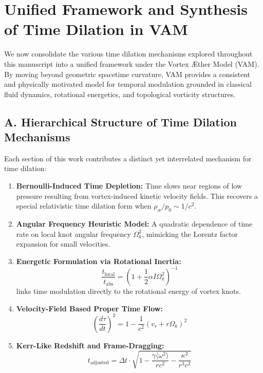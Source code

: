 \section{Unified Framework and Synthesis of Time Dilation in VAM}

We now consolidate the various time dilation mechanisms explored throughout this manuscript into a unified framework under the Vortex Æther Model (VAM). By moving beyond geometric spacetime curvature, VAM provides a consistent and physically motivated model for temporal modulation grounded in classical fluid dynamics, rotational energetics, and topological vorticity structures.

\subsection*{A. Hierarchical Structure of Time Dilation Mechanisms}

Each section of this work contributes a distinct yet interrelated mechanism for time dilation:

\begin{enumerate}
    \item \textbf{Bernoulli-Induced Time Depletion:} Time slows near regions of low pressure resulting from vortex-induced kinetic velocity fields. This recovers a special relativistic time dilation form when \( \rho_{\text{\ae}} / p_0 \sim 1/c^2 \).

    \item \textbf{Angular Frequency Heuristic Model:} A quadratic dependence of time rate on local knot angular frequency \( \Omega_k^2 \), mimicking the Lorentz factor expansion for small velocities.

    \item \textbf{Energetic Formulation via Rotational Inertia:}
    \[
        \boxed{\frac{t_{\text{local}}}{t_{\text{abs}}} = \left(1 + \frac{1}{2} \alpha I \Omega_k^2 \right)^{-1}}
    \]
    links time modulation directly to the rotational energy of vortex knots.

    \item \textbf{Velocity-Field Based Proper Time Flow:}
    \[
        \boxed{\left( \frac{d\tau}{dt} \right)^2 = 1 - \frac{1}{c^2}(v_r + r\Omega_k)^2}
    \]

    \item \textbf{Kerr-Like Redshift and Frame-Dragging:}
    \[
        \boxed{t_{\text{adjusted}} = \Delta t \cdot \sqrt{1 - \frac{\gamma \langle \omega^2 \rangle}{rc^2} - \frac{\kappa^2}{r^3c^2}}}
    \]
\end{enumerate}

